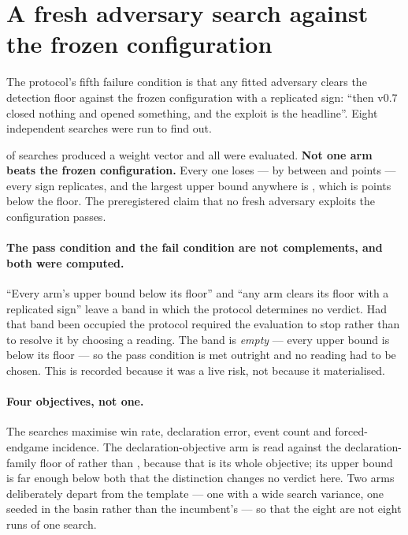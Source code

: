 \section{A fresh adversary search against the frozen configuration}
\label{sec:exploit}

The protocol's fifth failure condition is that any fitted adversary clears the detection floor against
the frozen configuration with a replicated sign: ``then v0.7 closed nothing and opened something, and
the exploit is the headline''. Eight independent searches were run to find out.

\begin{table}[t]\centering
\caption{Eight independent adversary searches against \frozen{}. A positive edge would mean the
adversary beats the target; every one is negative. Each arm was fitted on a stream disjoint from the
banks it is evaluated on.}
\label{tab:adversaries}

\end{table}

\vsevenBfourFits{} of \vsevenBfourArms{} searches produced a weight vector and all
\vsevenBfourArms{} were evaluated. \textbf{Not one arm beats the frozen configuration.} Every one
loses --- by between \vsevenBfourBestLoss{} and \vsevenBfourWorstLoss{} points --- every sign
replicates, and the largest upper bound anywhere is \vsevenBfourWorstUpper{}, which is
\vsevenBfourFloorGap{} points below the floor. The preregistered claim that no fresh adversary
exploits the configuration passes.

\paragraph{The pass condition and the fail condition are not complements, and both were computed.}
``Every arm's upper bound below its floor'' and ``any arm clears its floor with a replicated sign''
leave a band in which the protocol determines no verdict. Had that band been occupied the protocol
required the evaluation to stop rather than to resolve it by choosing a reading. The band is
\emph{empty} --- every upper bound is below its floor --- so the pass condition is met outright and no
reading had to be chosen. This is recorded because it was a live risk, not because it materialised.

\paragraph{Four objectives, not one.} The searches maximise win rate, declaration error, event count
and forced-endgame incidence. The declaration-objective arm is read against the declaration-family
floor of \vsevenDeclFloor{} rather than \vsevenPrimaryFloor{}, because that is its whole objective; its
upper bound is far enough below both that the distinction changes no verdict here. Two arms
deliberately depart from the template --- one with a wide search variance, one seeded in the \vfive{}
basin rather than the incumbent's --- so that the eight are not eight runs of one search.

